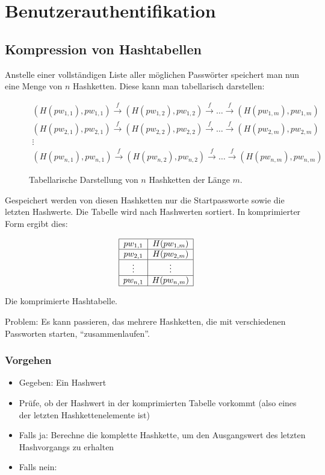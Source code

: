 \section{Benutzerauthentifikation}

\subsection{Kompression von Hashtabellen}
Anstelle einer vollständigen Liste aller möglichen Passwörter speichert
man nun eine Menge von $n$ Hashketten. Diese kann man tabellarisch darstellen:

\begin{figure}[h]
	\begin{gather*}
		(H(pw_{1,1}),pw_{1,1}) \xrightarrow{f}
		(H(pw_{1,2}),pw_{1,2}) \xrightarrow{f}\ldots\xrightarrow{f} (H(pw_{1,m}),pw_{1,m})\\
		(H(pw_{2,1}),pw_{2,1}) \xrightarrow{f} (H(pw_{2,2}),pw_{2,2}) \xrightarrow{f}\ldots\xrightarrow{f}
		(H(pw_{2,m}),pw_{2,m})\\ 
		\vdots\\ 
		(H(pw_{n,1}),pw_{n,1}) \xrightarrow{f}
		(H(pw_{n,2}),pw_{n,2}) \xrightarrow{f}\ldots\xrightarrow{f} (H(pw_{n,m}),pw_{n,m})
	\end{gather*}
	\caption{Tabellarische Darstellung von $n$ Hashketten der Länge
		$m$.}
\end{figure}

Gespeichert werden von diesen Hashketten nur die Startpassworte sowie die letzten Hashwerte. Die Tabelle wird nach Hashwerten sortiert. In komprimierter Form ergibt dies:

\begin{table}[!h]
	\begin{equation*}
		\begin{array}{|c|c|} \hline pw_{1,1} & H(pw_{1,m})\\
			\hline pw_{2,1} & H(pw_{2,m})\\
			\hline
			\vdots & \vdots \\
			\hline
			pw_{n,1} & H(pw_{n,m})\\
			\hline
		\end{array}
	\end{equation*}
	\caption{Die komprimierte Hashtabelle.}
\end{table}

Problem: Es kann passieren, das mehrere Hashketten, die mit verschiedenen Passworten starten, "`zusammenlaufen"'.

\subsubsection{Vorgehen}
\begin{itemize}
	\item Gegeben: Ein Hashwert
	\item Prüfe, ob der Hashwert in der komprimierten Tabelle vorkommt (also eines der letzten Hashkettenelemente ist)
	\item Falls ja: Berechne die komplette Hashkette, um den Ausgangswert des letzten Hashvorgangs zu erhalten
	\item Falls nein: %
\end{itemize}



